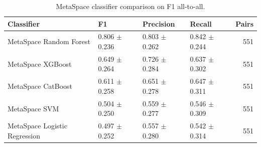 \begin{table}
\caption{MetaSpace classifier comparison on F1 all-to-all.}
\label{tab:metaspace_classifiers}
\begin{tabular}{llllr}
\toprule
Classifier & F1 & Precision & Recall & Pairs \\
\midrule
MetaSpace Random Forest & 0.806 $\pm$ 0.236 & 0.803 $\pm$ 0.262 & 0.842 $\pm$ 0.244 & 551 \\
MetaSpace XGBoost & 0.649 $\pm$ 0.264 & 0.726 $\pm$ 0.284 & 0.637 $\pm$ 0.302 & 551 \\
MetaSpace CatBoost & 0.611 $\pm$ 0.258 & 0.651 $\pm$ 0.278 & 0.647 $\pm$ 0.311 & 551 \\
MetaSpace SVM & 0.504 $\pm$ 0.250 & 0.559 $\pm$ 0.277 & 0.546 $\pm$ 0.309 & 551 \\
MetaSpace Logistic Regression & 0.497 $\pm$ 0.252 & 0.557 $\pm$ 0.280 & 0.542 $\pm$ 0.314 & 551 \\
\bottomrule
\end{tabular}
\end{table}
